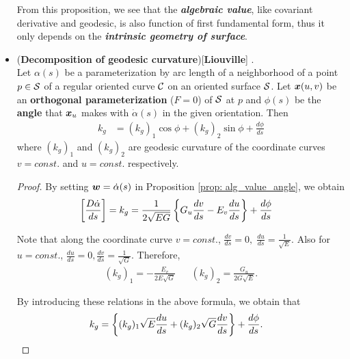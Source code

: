 \documentclass[11pt]{article}
\begin{document}
\begin{itemize}
From this proposition, we see that the \emph{\textbf{algebraic value}}, like covariant derivative and geodesic, is also function of first fundamental form, thus it only depends on the \emph{\textbf{intrinsic  geometry of surface}}.


\item \begin{proposition}\label{prop: liouville_formula}
(\textbf{Decomposition of geodesic curvature})[\textbf{Liouville}] \citep{do1976differential}.\\
Let $\alpha(s)$ be a parameterization by arc length of a neighborhood of a point $p\in {\mathcal S}$ of a regular oriented curve ${\mathcal C}$ on an oriented surface ${\mathcal S}$.  Let $\boldsymbol{x}(u,v)$ be an \textbf{orthogonal parameterization} ($F=0$) of ${\mathcal S}$ at $p$ and $\phi(s)$ be the \textbf{angle} that $\boldsymbol{x}_{u}$ makes with $\dot{\alpha}(s)$ in the given orientation. Then 
\begin{align}
k_{g} &= (k_{g})_{1}\cos\phi + (k_{g})_{2}\sin\phi + \frac{d\phi}{ds}  \label{eqn: geodesic_curvature_liouville}
\end{align}
where $(k_{g})_{1}$ and $ (k_{g})_{2}$ are geodesic curvature of the coordinate curves $v=const.$ and $u=const.$ respectively. 
\end{proposition}
\begin{proof}
By setting $\boldsymbol{w} = \dot{\alpha}(s)$ in Proposition \eqref{prop: alg_value_angle}, we obtain
\begin{align*}
\left[\frac{D\dot{\alpha}}{ds}\right] = k_{g}&=  \frac{1}{2\sqrt{EG}} \left\{G_{u}\frac{dv}{ds}  -E_{v}\frac{du}{ds} \right\} +\frac{d\phi}{ds} 
\end{align*}

Note that along the coordinate curve $v= const. $, $\frac{dv}{ds} = 0,\;\frac{du}{ds} = \frac{1}{\sqrt{E}}$. Also for $u= const. $, $\frac{du}{ds} = 0, \frac{dv}{ds} = \frac{1}{\sqrt{G}}$. Therefore,
\begin{align*}
 (k_{g})_{1} =  -\frac{E_{v}}{2E\sqrt{G}} &&  (k_{g})_{2} =  \frac{G_{u}}{2G\sqrt{E}} .
\end{align*}

By introducing these relations in the above formula, we obtain that
\begin{align*}
 k_{g}&= \left\{(k_{g})_{1}\sqrt{E}\frac{du}{ds} + (k_{g})_{2} \sqrt{G} \frac{dv}{ds}\right\} +\frac{d\phi}{ds}.
\end{align*}


\end{proof}
\end{itemize}
\end{document}
